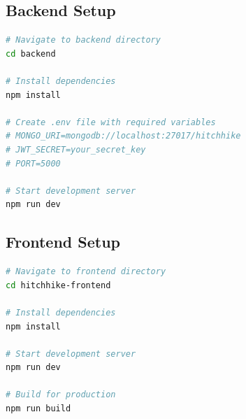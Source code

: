 \documentclass[12pt,a4paper]{article}
\begin{document}
\subsection{Backend Setup}
\begin{lstlisting}[language=bash]
# Navigate to backend directory
cd backend

# Install dependencies
npm install

# Create .env file with required variables
# MONGO_URI=mongodb://localhost:27017/hitchhike
# JWT_SECRET=your_secret_key
# PORT=5000

# Start development server
npm run dev
\end{lstlisting}

\subsection{Frontend Setup}
\begin{lstlisting}[language=bash]
# Navigate to frontend directory
cd hitchhike-frontend

# Install dependencies
npm install

# Start development server
npm run dev

# Build for production
npm run build
\end{lstlisting}
\end{document}
